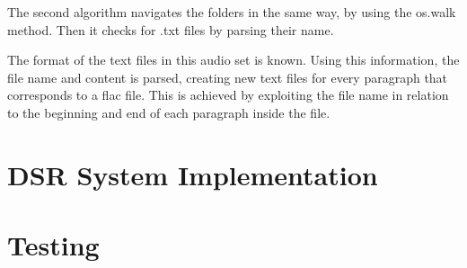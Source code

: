 

The second algorithm navigates the folders in the same way, by using the os.walk method. Then it checks for .txt files by parsing their name. 



The format of the text files in this audio set is known. Using this information, the file name and content is parsed, creating new text files for every paragraph that corresponds to a flac file. This is achieved by exploiting the file name in relation to the beginning and end of each paragraph inside the file.
 
 
 
\section{DSR System Implementation}

\section{Testing}










